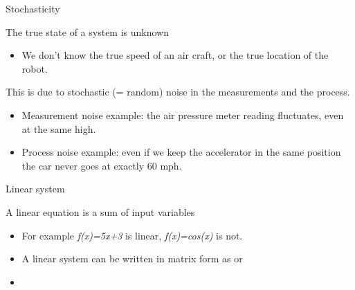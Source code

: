 \documentclass[compress]{beamer}
\providecommand{\tightlist}{%
  \setlength{\itemsep}{0pt}\setlength{\parskip}{0pt}}
\begin{document}
\begin{frame}{Stochasticity}

The true state of a system is unknown

\begin{itemize}
\tightlist
\item
  We don't know the true speed of an air craft, or the true location of
  the robot.
\end{itemize}

This is due to stochastic (= random) noise in the measurements and the
process.

\begin{itemize}
\tightlist
\item
  Measurement noise example: the air pressure meter reading fluctuates,
  even at the same high.
\item
  Process noise example: even if we keep the accelerator in the same
  position the car never goes at exactly 60 mph.
\end{itemize}

\end{frame}

\begin{frame}{Linear system}

A linear equation is a sum of input variables

\begin{itemize}
\tightlist
\item
  For example \emph{f(x)=5x+3} is linear, \emph{f(x)=cos(x)} is not.
\item
  A linear system can be written in matrix form as \emph{} or
\end{itemize}

\begin{itemize}
\tightlist
\item
  ~
\end{itemize}

~

\end{frame}
\end{document}
